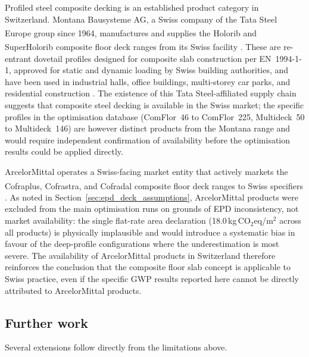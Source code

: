 Profiled steel composite decking is an established product category in Switzerland. Montana Bausysteme AG, a Swiss company of the Tata Steel Europe group since 1964, manufactures and supplies the Holorib\textsuperscript{\textregistered} and SuperHolorib\textsuperscript{\textregistered} composite floor deck ranges from its Swiss facility \citep{Montana_Holorib}. These are re-entrant dovetail profiles designed for composite slab construction per EN~1994-1-1, approved for static and dynamic loading by Swiss building authorities, and have been used in industrial halls, office buildings, multi-storey car parks, and residential construction \citep{Montana_Holorib}. The existence of this Tata Steel-affiliated supply chain suggests that composite steel decking is available in the Swiss market; the specific profiles in the optimisation database (ComFlor~46 to ComFlor~225, Multideck~50 to Multideck~146) are however distinct products from the Montana range and would require independent confirmation of availability before the optimisation results could be applied directly.

ArcelorMittal operates a Swiss-facing market entity that actively markets the Cofraplus\textsuperscript{\textregistered}, Cofrastra\textsuperscript{\textregistered}, and Cofradal\textsuperscript{\textregistered} composite floor deck ranges to Swiss specifiers \citep{AM_schweiz_cofraplus,AM_schweiz_cofradal}. As noted in Section~\ref{sec:epd_deck_assumptions}, ArcelorMittal products were excluded from the main optimisation runs on grounds of EPD inconsistency, not market availability: the single flat-rate area declaration (18.0\,kg\,CO$_2$eq/m$^2$ across all products) is physically implausible and would introduce a systematic bias in favour of the deep-profile configurations where the underestimation is most severe. The availability of ArcelorMittal products in Switzerland therefore reinforces the conclusion that the composite floor slab concept is applicable to Swiss practice, even if the specific GWP results reported here cannot be directly attributed to ArcelorMittal products.

\subsection{Further work}
\label{sec:disc_future}
Several extensions follow directly from the limitations above.

